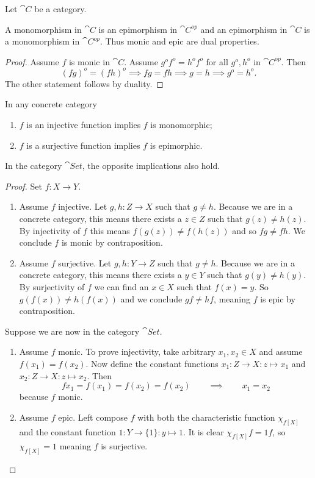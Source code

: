 \begin{lemma}
Let $\cat{C}$ be a category.

A monomorphism in $\cat{C}$ is an epimorphism in $\cat{C^{op}}$ and an epimorphism in $\cat{C}$ is a monomorphism in $\cat{C^{op}}$. Thus monic and epic are dual properties.
\end{lemma}
\begin{proof}
Assume $f$ is monic in $\cat{C}$. Assume $g^of^o = h^of^o$ for all $g^o, h^o$ in $\cat{C^{op}}$. Then
\[ (fg)^o = (fh)^o \implies fg = fh \implies g=h \implies g^o = h^o. \]
The other statement follows by duality.
\end{proof}

\begin{proposition} \label{injectiveMonoSurjectiveEpi}
In any concrete category
\begin{enumerate}
\item $f$ is an injective function implies $f$ is monomorphic;
\item $f$ is a surjective function implies $f$ is epimorphic.
\end{enumerate}
In the category $\cat{Set}$, the opposite implications also hold.
\end{proposition}
\begin{proof}
Set $f:X\to Y$.
\begin{enumerate}
\item Assume $f$ injective. Let $g,h: Z\to X$ such that $g\neq h$. Because we are in a concrete category, this means there exists a $z\in Z$ such that $g(z) \neq h(z)$. By injectivity of $f$ this means $f(g(z)) \neq f(h(z))$ and so $fg \neq fh$. We conclude $f$ is monic by contraposition.
\item Assume $f$ surjective. Let $g,h: Y\to Z$ such that $g\neq h$. Because we are in a concrete category, this means there exists a $y\in Y$ such that $g(y) \neq h(y)$. By surjectivity of $f$ we can find an $x\in X$ such that $f(x) = y$. So $g(f(x)) \neq h(f(x))$ and we conclude $gf \neq hf$, meaning $f$ is epic by contraposition.
\end{enumerate}
Suppose we are now in the category $\cat{Set}$.
\begin{enumerate}
\item Assume $f$ monic. To prove injectivity, take arbitrary $x_1,x_2\in X$ and assume $f(x_1) = f(x_2)$. Now define the constant functions $x_1: Z\to X: z\mapsto x_1$ and $x_2: Z\to X: z\mapsto x_2$. Then
\[ fx_1 = f(x_1) = f(x_2) = f(x_2) \qquad \implies \qquad x_1 = x_2 \]
because $f$ monic.
\item Assume $f$ epic. Left compose $f$ with both the characteristic function $\chi_{f[X]}$ and the constant function $1: Y\to \{1\}: y\mapsto 1$. It is clear $\chi_{f[X]}f = 1f$, so $\chi_{f[X]} = 1$ meaning $f$ is surjective.
\end{enumerate}
\end{proof}

